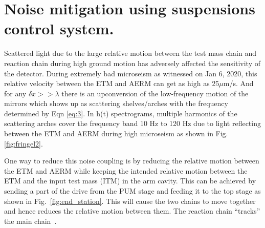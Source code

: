 \documentclass[12pt]{iopart}
\begin{document}
\qquad



\section{Noise mitigation using suspensions control system.} \label{rzero}

Scattered light due to the large relative motion between the test mass chain and reaction chain during high ground motion has adversely affected the sensitivity of the detector. 
During extremely bad microseism as witnessed on Jan 6, 2020, this relative velocity between the ETM and AERM can get as high as 25${\mu}$m/s. And for any ${\delta}x >> {\lambda}$ there is an upconversion of the low-frequency motion of the mirrors which shows up as scattering shelves/arches with the frequency determined by Eqn \ref{eq:3}. In h(t) spectrograms, multiple harmonics of the scattering arches cover the frequency band 10 Hz to 120 Hz due to light reflecting between the ETM and AERM during high microseism as shown in Fig. \ref{fig:fringel2}.

One way to reduce this noise coupling is by reducing the relative motion between the ETM and AERM while keeping the intended relative motion between the ETM and the input test mass (ITM) in the arm cavity. This can be achieved by sending a part of the drive from the PUM stage and feeding it to the top stage as shown in Fig.~\ref{fig:end_station}. This will cause the two chains to move together and hence reduces the relative motion between them. The reaction chain ``tracks'' the main chain~\cite{alog_robert}. 
\end{document}
